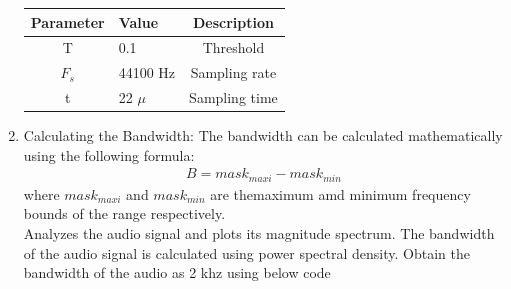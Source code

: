 \documentclass[journal,5pt,twocolumn]{IEEEtran}
\begin{document}
\begin{enumerate}
\begin{tabular}{|c|l|c|}
    \hline 
    \textbf{Parameter} & \textbf{Value} &\textbf{Description} \\ \hline
    T&0.1&Threshold\\
    $F_s$ & 44100 Hz & Sampling rate\\ 
    t     & 22 $\mu$ & Sampling time\\  \hline
    \end{tabular}
\vspace{10mm}
\item Calculating the Bandwidth: The bandwidth can be calculated mathematically using the following formula:
\begin{align*}
B=mask_{maxi}-mask_{min}
\end{align*}
where $mask_{maxi}$ and $mask_{min} $ are themaximum amd minimum frequency bounds of the range  respectively.\\
Analyzes the audio signal and plots its magnitude spectrum. The bandwidth of the audio signal is  calculated using power spectral density. Obtain the bandwidth of the audio as 2 khz using below code
\begin{center}
\end{center}
\end{enumerate}
\end{document}
